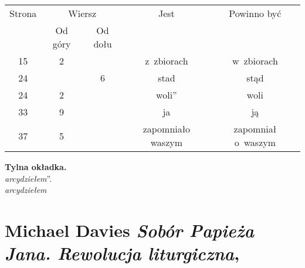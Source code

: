 \documentclass[a4paper,11pt]{article}
\numberwithin{equation}{section}
\begin{document}
\begin{center}

  \begin{tabular}{|c|c|c|c|c|}
    \hline
    Strona & \multicolumn{2}{c|}{Wiersz} & Jest
                              & Powinno być \\ \cline{2-3}
    & Od góry & Od dołu & & \\
    \hline
    15  & \hphantom{0}2 & & z~zbiorach & w~zbiorach \\
    24  & & \hphantom{0}6 & stad & stąd \\
    24  & \hphantom{0}2 & & woli” & woli \\
    33  & \hphantom{0}9 & & ja & ją \\
    37  & \hphantom{0}5 & & zapomniało waszym & zapomniał o~waszym \\
    \hline
  \end{tabular}

\end{center}

\VerSpaceTwo


\noindent
\textbf{Tylna okładka.} \\
\Jest  \textit{arcydziełem}”. \\
\PowinnoByc \textit{arcydziełem} \\












\section{Michael Davies
  \textit{Sobór Papieża Jana. Rewolucja liturgiczna},
  \parencite{}}




\VerSpaceFive
\end{document}
